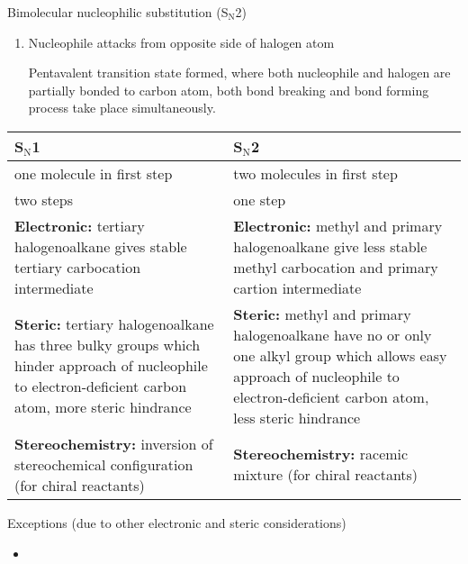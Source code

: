 \documentclass[12pt,a4 paper]{article}
\begin{document}
\begin{mechanism}{Bimolecular nucleophilic substitution (S$_\text{N}$2)}{}
\begin{enumerate}[leftmargin=0.65in,label=\textbf{Step \arabic*:}]
\item Nucleophile attacks from opposite side of halogen atom

Pentavalent transition state formed, where both nucleophile and halogen are partially bonded to carbon atom, both bond breaking and bond forming process take place simultaneously.
\end{enumerate}
\end{mechanism}

\begin{table}[H]
\centering
\begin{tabular}{p{}p{}}
\hline\hline
S$_\text{N}$1 & S$_\text{N}$2 \\
\hline
one molecule in first step & two molecules in first step \\
two steps & one step \\
\textbf{Electronic:} tertiary halogenoalkane gives stable tertiary carbocation intermediate & \textbf{Electronic:} methyl and primary halogenoalkane give less stable methyl carbocation and primary cartion intermediate \\
\textbf{Steric:} tertiary halogenoalkane has three bulky groups which hinder approach of nucleophile to electron-deficient carbon atom, more steric hindrance & \textbf{Steric:} methyl and primary halogenoalkane have no or only one alkyl group which allows easy approach of nucleophile to electron-deficient carbon atom, less steric hindrance \\
\textbf{Stereochemistry:} inversion of stereochemical configuration (for chiral reactants) & \textbf{Stereochemistry:} racemic mixture (for chiral reactants) \\
\hline\hline
\end{tabular}
\end{table}

Exceptions (due to other electronic and steric considerations)
\begin{itemize}
\item 
\end{itemize}
\end{document}
